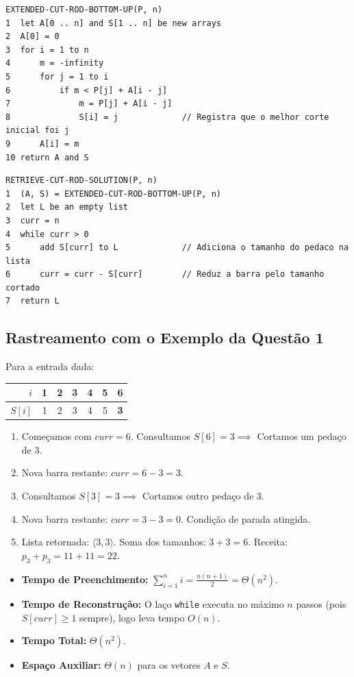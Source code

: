 \documentclass[11pt,a4paper]{article}
\begin{document}
\begin{lstlisting}[caption={Algoritmo com Registro de Cortes Auxiliares}]
EXTENDED-CUT-ROD-BOTTOM-UP(P, n)
1  let A[0 .. n] and S[1 .. n] be new arrays
2  A[0] = 0
3  for i = 1 to n
4      m = -infinity
5      for j = 1 to i
6          if m < P[j] + A[i - j]
7              m = P[j] + A[i - j]
8              S[i] = j             // Registra que o melhor corte inicial foi j
9      A[i] = m
10 return A and S
\end{lstlisting}

\begin{lstlisting}[caption={Algoritmo de Recuperação e Retorno dos Pedaços}]
RETRIEVE-CUT-ROD-SOLUTION(P, n)
1  (A, S) = EXTENDED-CUT-ROD-BOTTOM-UP(P, n)
2  let L be an empty list
3  curr = n
4  while curr > 0
5      add S[curr] to L             // Adiciona o tamanho do pedaco na lista
6      curr = curr - S[curr]        // Reduz a barra pelo tamanho cortado
7  return L
\end{lstlisting}

\subsection*{Rastreamento com o Exemplo da Questão 1}
Para a entrada dada:
\begin{center}
\begin{tabular}{r|cccccc}
\toprule
$i$ & 1 & 2 & 3 & 4 & 5 & 6 \\
\midrule
$S[i]$ & 1 & 2 & 3 & 4 & 5 & \textbf{3} \\
\bottomrule
\end{tabular}
\end{center}
\begin{enumerate}
    \item Começamos com $curr = 6$. Consultamos $S[6] = 3 \implies$ Cortamos um pedaço de $3$.
    \item Nova barra restante: $curr = 6 - 3 = 3$.
    \item Consultamos $S[3] = 3 \implies$ Cortamos outro pedaço de $3$.
    \item Nova barra restante: $curr = 3 - 3 = 0$. Condição de parada atingida.
    \item Lista retornada: $\langle 3, 3 \rangle$. Soma dos tamanhos: $3 + 3 = 6$. Receita: $p_3 + p_3 = 11 + 11 = 22$.
\end{enumerate}

\begin{dica}
\begin{itemize}
    \item \textbf{Tempo de Preenchimento:} $\sum_{i=1}^n i = \frac{n(n+1)}{2} = \Theta(n^2)$.
    \item \textbf{Tempo de Reconstrução:} O laço \texttt{while} executa no máximo $n$ passos (pois $S[curr] \ge 1$ sempre), logo leva tempo $O(n)$.
    \item \textbf{Tempo Total:} $\Theta(n^2)$.
    \item \textbf{Espaço Auxiliar:} $\Theta(n)$ para os vetores $A$ e $S$.
\end{itemize}
\end{dica}
\end{document}

